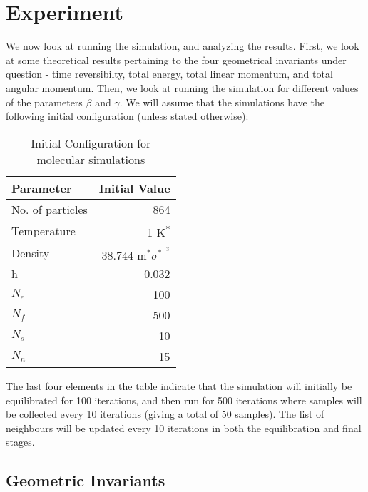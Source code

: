 \documentclass[../Main.tex]{subfiles}
\begin{document}
\section{Experiment}
We now look at running the simulation, and analyzing the results. First, we look at some theoretical results pertaining to the four geometrical invariants under question - time reversibilty, total energy, total linear momentum, and total angular momentum. Then, we look at running the simulation for different values of the parameters $\beta$ and $\gamma$.
We will assume that the simulations have the following initial configuration (unless stated otherwise):

\begin{table}[H]
	\centering
	\begin{tabular}{ |l|r| }
		\hline
		Parameter & Initial Value \\
		\hline
		No. of particles & 864 \\
		Temperature & 1 K\textsuperscript{*} \\
		Density & $38.744 \mbox{ m}^{*}\sigma^{*^{-3}}$ \\
		h & 0.032 \\
		$N_{e}$ & 100 \\
		$N_{f}$ & 500 \\
		$N_{s}$ & 10 \\
		$N_{n}$ & 15 \\
		\hline
	\end{tabular}
	\caption{Initial Configuration for molecular simulations}
	\label{tbl:initial_configuration_simulation}
\end{table}

The last four elements in the table indicate that the simulation will initially be equilibrated for 100 iterations, and then run for 500 iterations where samples will be collected every 10 iterations (giving a total of 50 samples). The list of neighbours will be updated every 10 iterations in both the equilibration and final stages.

\subsection{Geometric Invariants}
\end{document}
